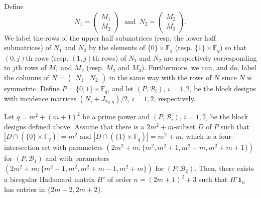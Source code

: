 \documentclass[ALCO,ThmDefs,Unicode]{cedram}
\newcommand*\F{{\mathbb F}}
\newcommand*{\un}{\mathbf{1}}
\begin{document}
Define
\[
N_1=
\begin{pmatrix} M_1 \\ M_2
\end{pmatrix} \, \, \mbox{ and }\, N_2=
\begin{pmatrix} M_2 \\ M_3
\end{pmatrix}.
\]
We label the rows of the upper half submatrices (resp. the lower half submatrices) of $N_1$ and $N_2$ by the elements of $\{0\}\times \F_q$ (resp. $\{1\}\times \F_q$) so that $(0,j)$th rows (resp. $(1,j)$th rows) of $N_1$ and $N_2$ are respectively corresponding to $j$th rows of $M_1$ and $M_2$ (resp. $M_2$ and $M_3$). Furthermore, we can, and do, label the columns of $N=\begin{pmatrix} N_1& N_2 \end{pmatrix} $ in the same way with the rows of $N$ since $N$ is symmetric. Define $P=\{0,1\}\times \F_q$, and let $(P,{\mathcal B}_i)$, $i=1,2$, be the block designs with incidence matrices $(N_i+J_{2q,q})/2$, $i=1,2$, respectively.

\begin{prop}\label{prop:const2}
Let $q=m^2+(m+1)^2$ be a prime power and $(P,{\mathcal B}_i)$, $i=1,2$, be the block designs defined above. Assume that there is a $2m^2+m$-subset $D$ of $P$ such that $|D\cap (\{0\}\times \F_q)|=m^2$ and $|D\cap (\{1\}\times \F_q)|=m^2+m$, which is a four-intersection set with parameters $(2m^2+m;\{m^2,m^2+1,m^2+m,m^2+m+1\})$ for $(P,{\mathcal B}_1)$ and with parameters $(2m^2+m;\{m^2-1,m^2,m^2+m-1,m^2+m\})$ for $(P,{\mathcal B}_2)$. Then, there exists a biregular Hadamard matrix $H'$ of order $n=(2m+1)^2+3$ such that $H'\un_{n}$ has entries in $\{2m-2,2m+2\}$.
\end{prop}
\end{document}
